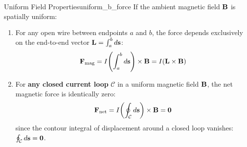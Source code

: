 \begin{proposition}{Uniform Field Properties}{uniform_b_force}
If the ambient magnetic field $\vb{B}$ is spatially uniform:
\begin{enumerate}
    \item For any open wire between endpoints $a$ and $b$, the force depends exclusively on the end-to-end vector $\vb{L} = \int_{a}^{b} d\vb{s}$:
    \begin{equation}
        \vb{F}_{\mathrm{mag}} = I \qty(\int_{a}^{b} d\vb{s}) \times \vb{B} = I (\vb{L} \times \vb{B})
    \end{equation}
    \item For \textbf{any closed current loop} $\mathcal{C}$ in a uniform magnetic field $\vb{B}$, the net magnetic force is identically zero:
    \begin{equation}
        \vb{F}_{\mathrm{net}} = I \qty(\oint_{\mathcal{C}} d\vb{s}) \times \vb{B} = \vb{0}
    \end{equation}
    since the contour integral of displacement around a closed loop vanishes: $\oint_{\mathcal{C}} d\vb{s} = \vb{0}$.
\end{enumerate}
\end{proposition}

